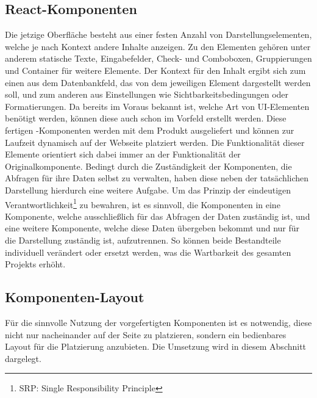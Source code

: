 \subsection{React-Komponenten}
Die jetzige Oberfläche besteht aus einer festen Anzahl von Darstellungselementen, welche je nach Kontext andere Inhalte anzeigen. Zu den Elementen gehören unter anderem statische Texte, Eingabefelder, Check- und Comboboxen, Gruppierungen und Container für weitere Elemente. Der Kontext für den Inhalt ergibt sich zum einen aus dem Datenbankfeld, das von dem jeweiligen Element dargestellt werden soll, und zum anderen aus Einstellungen wie Sichtbarkeitsbedingungen oder Formatierungen. Da bereits im Voraus bekannt ist, welche Art von UI-Elementen benötigt werden, können diese auch schon im Vorfeld erstellt werden. Diese fertigen -Komponenten werden mit dem Produkt ausgeliefert und können zur Laufzeit dynamisch auf der Webseite platziert werden. Die Funktionalität dieser Elemente orientiert sich dabei immer an der Funktionalität der Originalkomponente.
Bedingt durch die Zuständigkeit der Komponenten, die Abfragen für ihre Daten selbst zu verwalten, haben diese neben der tatsächlichen Darstellung hierdurch eine weitere Aufgabe. Um das Prinzip der eindeutigen Verantwortlichkeit\footnote{SRP\@: Single Responsibility Principle} zu bewahren, ist es sinnvoll, die Komponenten in eine Komponente, welche ausschließlich für das Abfragen der Daten zuständig ist, und eine weitere Komponente, welche diese Daten übergeben bekommt und nur für die Darstellung zuständig ist, aufzutrennen. So können beide Bestandteile individuell verändert oder ersetzt werden, was die Wartbarkeit des gesamten Projekts erhöht.

\subsection{Komponenten-Layout}
Für die sinnvolle Nutzung der vorgefertigten Komponenten ist es notwendig, diese nicht nur nacheinander auf der Seite zu platzieren, sondern ein bedienbares Layout für die Platzierung anzubieten. Die Umsetzung wird in diesem Abschnitt dargelegt.

